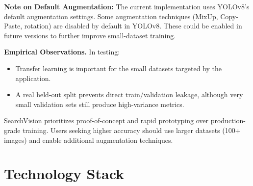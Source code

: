 \documentclass[12pt, letterpaper]{article}
\begin{document}
\textbf{Note on Default Augmentation:} The current implementation uses YOLOv8's default augmentation settings. 
Some augmentation techniques (MixUp, Copy-Paste, rotation) are disabled by default in YOLOv8. These could be 
enabled in future versions to further improve small-dataset training.

\textbf{Empirical Observations.} In testing:
\begin{itemize}
  \item Transfer learning is important for the small datasets targeted by the application.
  \item A real held-out split prevents direct train/validation leakage, although very small
    validation sets still produce high-variance metrics.
\end{itemize}

SearchVision prioritizes proof-of-concept and rapid prototyping over production-grade training. 
Users seeking higher accuracy should use larger datasets (100+ images) and enable additional augmentation techniques.

\section{Technology Stack}
\end{document}
